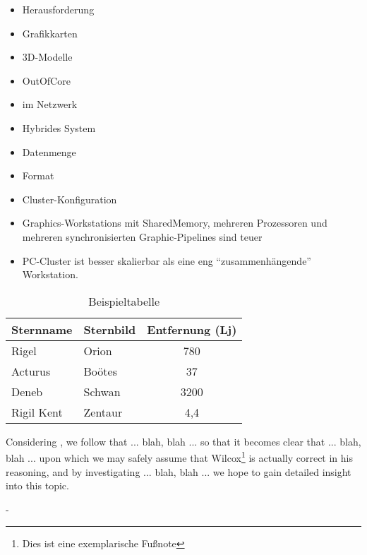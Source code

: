 \begin{itemize}
 \item Herausforderung
 \item Grafikkarten
 \item 3D-Modelle
 \item OutOfCore
 \item im Netzwerk
 \item Hybrides System
 \item Datenmenge
 \item Format
 \item Cluster-Konfiguration
 \item Graphics-Workstations mit SharedMemory, mehreren Prozessoren und mehreren synchronisierten Graphic-Pipelines sind teuer
 \item PC-Cluster ist besser skalierbar als eine eng "`zusammenhängende"' Workstation.
\end{itemize}

\begin{table}
 \centering
 \begin{tabular}{llc} %
  \toprule %
  Sternname & Sternbild & Entfernung (Lj) \\
  \midrule
  Rigel & Orion & 780 \\
  Acturus & Boötes & 37 \\
  Deneb & Schwan & 3200 \\
  Rigil Kent & Zentaur & 4,4 \\
  \bottomrule
 \end{tabular} 
 \caption{Beispieltabelle}
 \label{tab:Sterne}
\end{table}

Considering \cite{gpugems2}, we follow that ... blah, blah ... so that it becomes
clear that ... blah, blah ... upon which we may safely assume that Wilcox\footnote{Dies ist eine exemplarische Fußnote} is
actually correct in his reasoning, and by investigating ... blah, blah ...
we hope to gain detailed insight into this topic.

-


%
%
